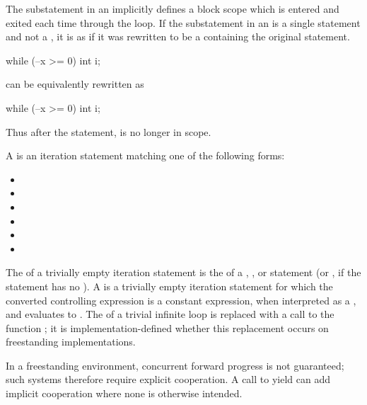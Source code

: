 \pnum
{}%
The substatement in an  implicitly defines
a block scope which is entered and exited each time
through the loop.
If the substatement in an  is
a single statement and not a ,
it is as if it was rewritten to be
a  containing the original statement.
\begin{example}
\begin{codeblock}
while (--x >= 0)
  int i;
\end{codeblock}
can be equivalently rewritten as
\begin{codeblock}
while (--x >= 0) {
  int i;
}
\end{codeblock}
Thus after the  statement,  is no longer in scope.
\end{example}

\pnum
A  is
an iteration statement matching one of the following forms:
\begin{itemize}
\item {}  \tcode{) ;}
\item {}  \tcode{) \{ \}}
\item {}  \tcode{) ;}
\item {}  \tcode{) ;}
\item {}   \tcode{; ) ;}
\item {}   \tcode{; ) \{ \}}
\end{itemize}
The  of a trivially empty iteration statement
is the  of
a , , or  statement
(or , if the  statement has no ).
A  is a trivially empty iteration statement
for which the converted controlling expression is a constant expression,
when interpreted as a , and
evaluates to .
The  of a trivial infinite loop is replaced with
a call to the function ;
it is implementation-defined whether this replacement occurs
on freestanding implementations.
\begin{note}
In a freestanding environment,
concurrent forward progress is not guaranteed;
such systems therefore require explicit cooperation.
A call to yield can add implicit cooperation where none is otherwise intended.
\end{note}

